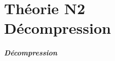 \documentclass[../../main.tex]{subfiles} %
\begin{document}
\ifSubfilesClassLoaded{
    \begin{frame}
        \titlepage
    \end{frame}
}{
}

\part[Décompression]{Théorie N2 \\ Décompression}

\begin{frame}
    \frametitle{Décompression}
    \tableofcontents %
\end{frame}







\end{document}
